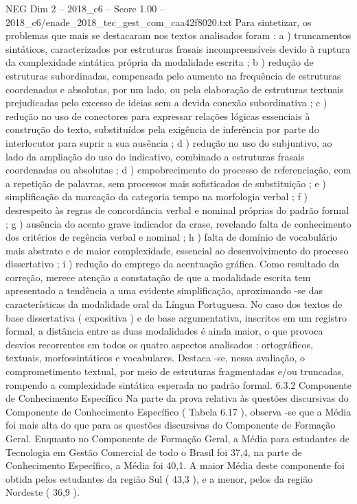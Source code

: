 \begin{textsample}{NEG Dim 2 – 2018\_c6 – Score 1.00 – 2018\_c6/enade\_2018\_tec\_gest\_com\_caa42f8020.txt}
Para sintetizar, os problemas que mais se destacaram nos textos analisados foram : a ) truncamentos sintáticos, caracterizados por estruturas frasais incompreensíveis devido à ruptura da complexidade sintática própria da modalidade escrita ; b ) redução de estruturas subordinadas, compensada pelo aumento na frequência de estruturas coordenadas e absolutas, por um lado, ou pela elaboração de estruturas textuais prejudicadas pelo excesso de ideias sem a devida conexão subordinativa ; c ) redução no uso de conectores para expressar relações lógicas essenciais à construção do texto, substituídos pela exigência de inferência por parte do interlocutor para suprir a sua ausência ; d ) redução no uso do subjuntivo, ao lado da ampliação do uso do indicativo, combinado a estruturas frasais coordenadas ou absolutas ; d ) empobrecimento do processo de referenciação, com a repetição de palavras, sem processos mais sofisticados de substituição ; e ) simplificação da marcação da categoria tempo na morfologia verbal ; f ) desrespeito às regras de concordância verbal e nominal próprias do padrão formal ; g ) ausência do acento grave indicador da crase, revelando falta de conhecimento dos critérios de regência verbal e nominal ; h ) falta de domínio de vocabulário mais abstrato e de maior complexidade, essencial ao desenvolvimento do processo dissertativo ; i ) redução do emprego da acentuação gráfica.
Como resultado da correção, merece atenção a constatação de que a modalidade escrita tem apresentado a tendência a uma evidente simplificação, aproximando -se das características da modalidade oral da Língua Portuguesa.
No caso dos textos de base dissertativa ( expositiva ) e de base argumentativa, inscritos em um registro formal, a distância entre as duas modalidades é ainda maior, o que provoca desvios recorrentes em todos os quatro aspectos analisados : ortográficos, textuais, morfossintáticos e vocabulares.
Destaca -se, nessa avaliação, o comprometimento textual, por meio de estruturas fragmentadas e/ou truncadas, rompendo a complexidade sintática esperada no padrão formal. 6.3.2 Componente de Conhecimento Específico Na parte da prova relativa às questões discursivas do Componente de Conhecimento Específico ( Tabela 6.17 ), observa -se que a Média foi mais alta do que para as questões discursivas do Componente de Formação Geral.
Enquanto no Componente de Formação Geral, a Média para estudantes de Tecnologia em Gestão Comercial de todo o Brasil foi 37,4, na parte de Conhecimento Específico, a Média foi 40,1.
A maior Média deste componente foi obtida pelos estudantes da região Sul ( 43,3 ), e a menor, pelos da região Nordeste ( 36,9 ).

\end{textsample}
